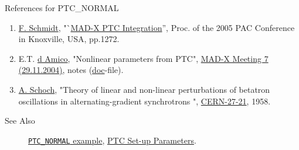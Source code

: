 \begin{description}
\item[References for PTC\_NORMAL] 
\end{description}

\begin{enumerate}
\item \href{F._Schmidt}{F. Schmidt},
  "`\href{http://cern.ch/madx/doc/MPPE012.pdf}{MAD-X PTC Integration}'',
  Proc. of the 2005 PAC Conference in Knoxville, USA, pp.1272. 
\item E.T. \href{d Amico}{d Amico}, "Nonlinear parameters from PTC",
  \href{http://cern.ch/frs/MAD-X_minutes/Meeting-7}{MAD-X Meeting 7
    (29.11.2004)}, notes
  (\href{http://cern.ch/frs/MAD-X_minutes/Meeting-7/Nonlinear_parameters_from_PTC.doc}{doc}-file). 
\item \href{A._Schoch}{A. Schoch}, "Theory of linear and non-linear
  perturbations of betatron oscillations in alternating-gradient
  synchrotrons ",
  \href{http://cern.ch/madx/doc/yellow-report-1957.pdf}{CERN-27-21},
  1958. 
\end{enumerate}

\begin{description}
\item[See Also]
  \href{http://cern.ch/frs/mad-X_examples/ptc_normal}{\texttt{PTC\_NORMAL}
    example}, \href{../ptc_general/ptc_general.html}{PTC Set-up
    Parameters}. 
\end{description}




